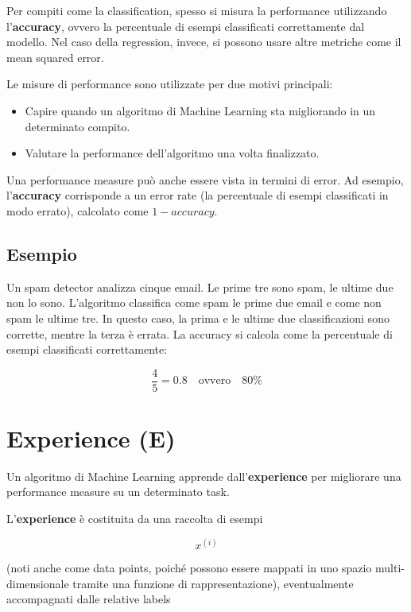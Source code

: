 Per compiti come la classification, spesso si misura la performance utilizzando l'\textbf{accuracy}, ovvero la percentuale di esempi classificati correttamente dal modello. Nel caso della regression, invece, si possono usare altre metriche come il mean squared error.

\noindent
Le misure di performance sono utilizzate per due motivi principali:

\begin{itemize}
\item Capire quando un algoritmo di Machine Learning sta migliorando in un determinato compito.
\item Valutare la performance dell'algoritmo una volta finalizzato.
\end{itemize}

\noindent
Una performance measure può anche essere vista in termini di error. Ad esempio, l'\textbf{accuracy} corrisponde a un error rate (la percentuale di esempi classificati in modo errato), calcolato come \( 1 - accuracy \).

\subsection{Esempio}

Un spam detector analizza cinque email. Le prime tre sono spam, le ultime due non lo sono. L'algoritmo classifica come spam le prime due email e come non spam le ultime tre. In questo caso, la prima e le ultime due classificazioni sono corrette, mentre la terza è errata. La accuracy si calcola come la percentuale di esempi classificati correttamente:

$$
\frac{4}{5} = 0.8 \quad \text{ovvero} \quad 80\%
$$

\section{Experience (E)}

Un algoritmo di Machine Learning apprende dall'\textbf{experience} per migliorare una performance measure su un determinato task.

\noindent
L'\textbf{experience} è costituita da una raccolta di esempi

\[
 x^{(i)}
\]

\noindent
(noti anche come data points, poiché possono essere mappati in uno spazio multi-dimensionale tramite una funzione di rappresentazione), eventualmente accompagnati dalle relative labels 

